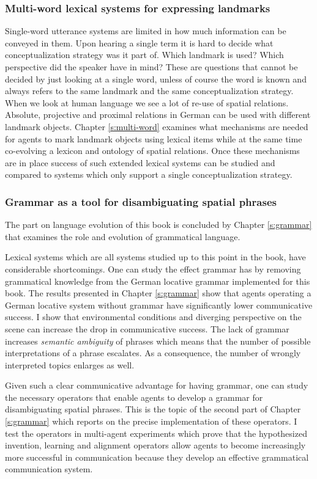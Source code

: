 \subsubsection{Multi-word lexical systems for expressing landmarks}
Single-word utterance systems are limited in how much information can be conveyed
in them. Upon hearing a single term it is hard to decide what conceptualization
strategy was it part of. Which landmark is used? Which perspective
did the speaker have in mind? These are questions that cannot be decided
by just looking at a single word, unless of course the word is known and always
refers to the same landmark and the same conceptualization strategy.
When we look at human language we see a lot of re-use of spatial relations.
Absolute, projective and proximal relations in German can be used with
different landmark objects. Chapter \ref{s:multi-word} examines what mechanisms
are needed for agents to mark landmark objects using lexical items 
while at the same time co-evolving a lexicon and ontology of spatial relations. 
Once these mechanisms are in place success of such extended lexical systems
can be studied and compared to systems which only support a single
conceptualization strategy.

\subsubsection{Grammar as a tool for disambiguating spatial phrases}
The part on language evolution of this book is concluded by Chapter \ref{s:grammar} that examines
the role and evolution of grammatical language. 

Lexical systems which are all systems studied up to this point in the book, 
have considerable shortcomings. One can study the effect grammar has by removing
grammatical knowledge from the German locative grammar implemented for this
book. The results presented in Chapter \ref{s:grammar} show that agents operating a 
German locative system without grammar have significantly lower communicative 
success. I show that environmental conditions and diverging perspective on the scene can increase 
the drop in communicative success. The lack of grammar increases \emph{semantic
ambiguity} of phrases which means that the number of possible interpretations
of a phrase escalates. As a consequence, the number of wrongly interpreted topics enlarges
as well.

Given such a clear communicative advantage for having grammar, one can 
study the necessary operators that enable agents to develop a grammar for 
disambiguating spatial phrases. This is the topic of the second part of 
Chapter \ref{s:grammar} which reports on the precise implementation of these operators.
I test the operators in multi-agent experiments which prove that the 
hypothesized invention, learning and alignment operators allow agents 
to become increasingly more successful in communication because 
they develop an effective grammatical communication system.

%
% 
% 
% 